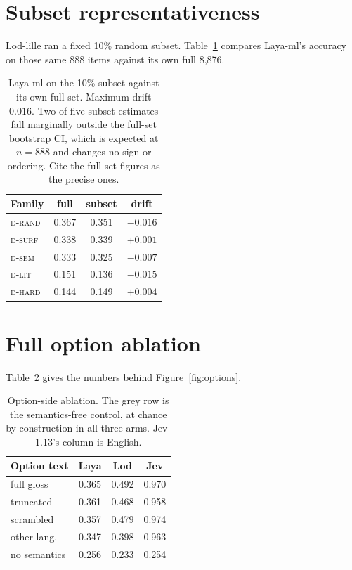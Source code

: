 \documentclass[11pt]{article}
\newcommand{\laya}[1]{\cellcolor{fLaya}#1}
\newcommand{\lod}[1]{\cellcolor{fLod}#1}
\newcommand{\jev}[1]{\cellcolor{fJev}#1}
\newcommand{\neu}[1]{\cellcolor{fGrey!55}#1}
\newcommand{\Drand}{\textsc{d-rand}}
\newcommand{\Dsurf}{\textsc{d-surf}}
\newcommand{\Dsem}{\textsc{d-sem}}
\newcommand{\Dlit}{\textsc{d-lit}}
\newcommand{\Dhard}{\textsc{d-hard}}
\begin{document}
\section{Subset representativeness}
\label{app:subset}

Lod-lille ran a fixed 10\% random subset. Table~\ref{tab:subset} compares
Laya-ml's accuracy on those same 888 items against its own full 8{,}876.

\begin{table}[h]
\centering\small
\setlength{\tabcolsep}{5pt}
\begin{tabular}{lccc}
\toprule
\textbf{Family} & \neu{\textbf{full}} & \neu{\textbf{subset}} & \textbf{drift} \\
\midrule
\Drand & \laya{0.367} & \laya{0.351} & $-0.016$ \\
\Dsurf & \laya{0.338} & \laya{0.339} & $+0.001$ \\
\Dsem  & \laya{0.333} & \laya{0.325} & $-0.007$ \\
\Dlit  & \laya{0.151} & \laya{0.136} & $-0.015$ \\
\Dhard & \laya{0.144} & \laya{0.149} & $+0.004$ \\
\bottomrule
\end{tabular}
\caption{Laya-ml on the 10\% subset against its own full set. Maximum drift
$0.016$. Two of five subset estimates fall marginally outside the full-set
bootstrap CI, which is expected at $n = 888$ and changes no sign or ordering.
Cite the full-set figures as the precise ones.}
\label{tab:subset}
\end{table}

\section{Full option ablation}
\label{app:options}

Table~\ref{tab:options} gives the numbers behind Figure~\ref{fig:options}.

\begin{table}[h]
\centering\small
\setlength{\tabcolsep}{4pt}
\begin{tabular}{lccc}
\toprule
\textbf{Option text} & \laya{\textbf{Laya}} & \lod{\textbf{Lod}} & \jev{\textbf{Jev}} \\
\midrule
full gloss   & \laya{0.365} & \lod{0.492} & \jev{0.970} \\
truncated    & \laya{0.361} & \lod{0.468} & \jev{0.958} \\
scrambled    & \laya{0.357} & \lod{0.479} & \jev{0.974} \\
other lang.  & \laya{0.347} & \lod{0.398} & \jev{0.963} \\
no semantics & \neu{0.256} & \neu{0.233} & \neu{0.254} \\
\bottomrule
\end{tabular}
\caption{Option-side ablation. The grey row is the semantics-free control, at
chance by construction in all three arms. Jev-1.13's column is English.}
\label{tab:options}
\end{table}
\end{document}
